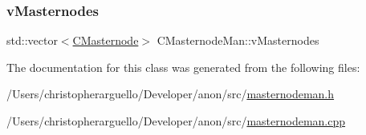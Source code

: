 \mbox{\label{class_c_masternode_man_a59413613b16eca496f9ae35697932b9b}} 
\subsubsection{\texorpdfstring{v\+Masternodes}{vMasternodes}}
{\footnotesize\ttfamily std\+::vector$<$\mbox{\hyperlink{class_c_masternode}{C\+Masternode}}$>$ C\+Masternode\+Man\+::v\+Masternodes\hspace{0.3cm}{\ttfamily [private]}}



The documentation for this class was generated from the following files\+:\begin{DoxyCompactItemize}
\item 
/\+Users/christopherarguello/\+Developer/anon/src/\mbox{\hyperlink{masternodeman_8h}{masternodeman.\+h}}\item 
/\+Users/christopherarguello/\+Developer/anon/src/\mbox{\hyperlink{masternodeman_8cpp}{masternodeman.\+cpp}}\end{DoxyCompactItemize}
